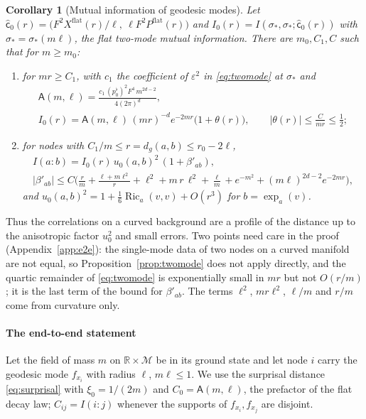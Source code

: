 \documentclass[11pt,a4paper]{article}
\theoremstyle{stmt}
\newtheorem{corollary}[theorem]{Corollary}
\theoremstyle{defn}
\theoremstyle{rmk}
\numberwithin{equation}{section}
\DeclareMathOperator{\Ric}{Ric}
\newcommand{\M}{\mathcal{M}}
\newcommand{\R}{\mathbb{R}}
\begin{document}
\begin{corollary}[Mutual information of geodesic modes]\label{cor:curvedMI}
Let $\hat{\mathsf c}_0(r)=\big(F^2X^{\mathrm{flat}}(r)/\ell,\ \ell F^2P^{\mathrm{flat}}(r)\big)$ and $I_0(r)=I(\sigma_*,\sigma_*;\hat{\mathsf c}_0(r))$ with $\sigma_*=\sigma_*(m\ell)$, the flat two-mode mutual information. There are $m_0,C_1,C$ such that for $m\ge m_0$:
\begin{enumerate}[label=\textup{(\roman*)}]
\item for $mr\ge C_1$, with $c_1$ the coefficient of $\varepsilon^2$ in \eqref{eq:twomode} at $\sigma_*$ and
\begin{equation}\label{eq:Aml}
\begin{gathered}
\mathsf A(m,\ell)=\frac{c_1\,(p_0^\flat)^2F^4\,m^{2d-2}}{4(2\pi)^d},\\
I_0(r)=\mathsf A(m,\ell)\,(mr)^{-d}e^{-2mr}\big(1+\theta(r)\big),\qquad|\theta(r)|\le\frac{C}{mr}\le\frac12;
\end{gathered}
\end{equation}
\item for nodes with $C_1/m\le r=d_g(a,b)\le r_0-2\ell$,
\begin{gather*}
I(a:b)=I_0(r)\,u_0(a,b)^2\,(1+\beta'_{ab}),\\
|\beta'_{ab}|\le C\Big(\frac rm+\frac{\ell+m\ell^2}{r}+\ell^2+m\,r\,\ell^2+\frac\ell m+e^{-m^2}+(m\ell)^{2d-2}e^{-2mr}\Big),
\end{gather*}
and $u_0(a,b)^2=1+\tfrac16\Ric_a(v,v)+O(r^3)$ for $b=\exp_a(v)$.
\end{enumerate}
\end{corollary}

Thus the correlations on a curved background are a profile of the distance up to the anisotropic factor $u_0^2$ and small errors. Two points need care in the proof (Appendix~\ref{app:e2e}): the single-mode data of two nodes on a curved manifold are not equal, so Proposition~\ref{prop:twomode} does not apply directly, and the quartic remainder of \eqref{eq:twomode} is exponentially small in $mr$ but not $O(r/m)$; it is the last term of the bound for $\beta'_{ab}$. The terms $\ell^2$, $mr\ell^2$, $\ell/m$ and $r/m$ come from curvature only.

\paragraph{The end-to-end statement} Let the field of mass $m$ on $\R\times\M$ be in its ground state and let node $i$ carry the geodesic mode $f_{x_i}$ with radius $\ell$, $m\ell\le1$. We use the surprisal distance \eqref{eq:surprisal} with $\xi_0=1/(2m)$ and $C_0=\mathsf A(m,\ell)$, the prefactor of the flat decay law; $C_{ij}=I(i:j)$ whenever the supports of $f_{x_i},f_{x_j}$ are disjoint.
\end{document}
